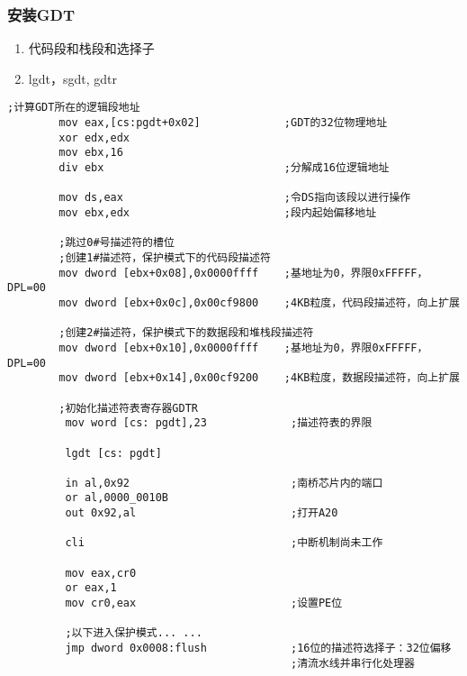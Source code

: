 \documentclass[a4paper,11pt,UTF8]{ctexart}
\begin{document}
			
		\subsubsection{安装GDT}
			\begin{enumerate}
				\item 代码段和栈段和选择子
				

				\item lgdt，sgdt, gdtr
			\end{enumerate}
			
	\begin{lstlisting}[caption={make gdt},tabsize=4,basicstyle=\footnotesize,captionpos=b]
		;计算GDT所在的逻辑段地址
		mov eax,[cs:pgdt+0x02]             ;GDT的32位物理地址 
		xor edx,edx
		mov ebx,16
		div ebx                            ;分解成16位逻辑地址 

		mov ds,eax                         ;令DS指向该段以进行操作
		mov ebx,edx                        ;段内起始偏移地址 

		;跳过0#号描述符的槽位 
		;创建1#描述符，保护模式下的代码段描述符
		mov dword [ebx+0x08],0x0000ffff    ;基地址为0，界限0xFFFFF，DPL=00 
		mov dword [ebx+0x0c],0x00cf9800    ;4KB粒度，代码段描述符，向上扩展 

		;创建2#描述符，保护模式下的数据段和堆栈段描述符 
		mov dword [ebx+0x10],0x0000ffff    ;基地址为0，界限0xFFFFF，DPL=00
		mov dword [ebx+0x14],0x00cf9200    ;4KB粒度，数据段描述符，向上扩展 

		;初始化描述符表寄存器GDTR
         mov word [cs: pgdt],23             ;描述符表的界限   
 
         lgdt [cs: pgdt]
      
         in al,0x92                         ;南桥芯片内的端口 
         or al,0000_0010B
         out 0x92,al                        ;打开A20

         cli                                ;中断机制尚未工作

         mov eax,cr0                  
         or eax,1
         mov cr0,eax                        ;设置PE位
      
         ;以下进入保护模式... ...
         jmp dword 0x0008:flush             ;16位的描述符选择子：32位偏移
                                            ;清流水线并串行化处理器
	\end{lstlisting}

			
\end{document}
